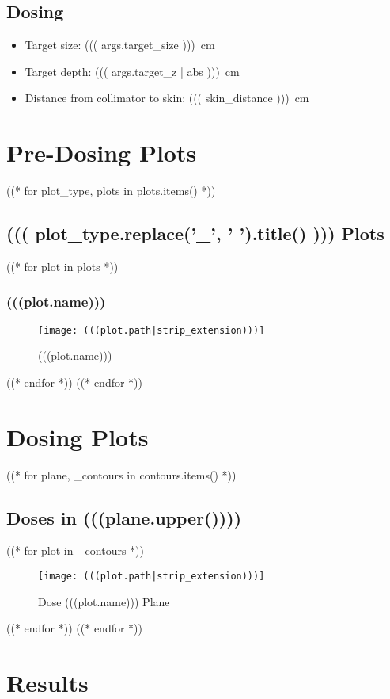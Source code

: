 \documentclass[12pt]{article}
\begin{document}
\subsection{Dosing}
\begin{itemize}
	\item Target size: \SI{((( args.target_size )))}{\cm}
	\item Target depth: \SI{((( args.target_z | abs )))}{\cm}
	\item Distance from collimator to skin: \SI{((( skin_distance )))}{\cm}
\end{itemize}
	
\section{Pre-Dosing Plots}
((* for plot_type, plots in plots.items() *))
	\subsection{((( plot_type.replace('_', ' ').title() ))) Plots}
		((* for plot in plots *))
			\subsubsection{(((plot.name)))}
			\begin{figure}[H]
			\centering
			\texttt{[image: (((plot.path|strip\_extension)))]}
			\caption{(((plot.name)))}
			\label{fig:(((plot.slug)))}
			\end{figure}
		((* endfor *))
((* endfor *))

\section{Dosing Plots}


((* for plane, _contours in contours.items() *))
	\subsection{Doses in (((plane.upper())))}
	((* for plot in _contours *))
	\begin{figure}[H]
	\centering
	\texttt{[image: (((plot.path|strip\_extension)))]}
	\caption{Dose (((plot.name))) Plane}
	\label{fig:(((plot.slug)))}
	\end{figure}
	((* endfor *))
((* endfor *))

\section{Results}
\end{document}
